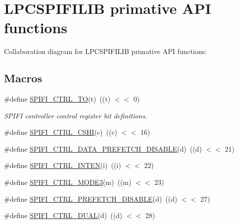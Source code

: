 \hypertarget{group___l_p_c_s_p_i_f_i_l_i_b___h_w___p_r_i_m}{}\section{L\+P\+C\+S\+P\+I\+F\+I\+L\+IB primative A\+PI functions}
\label{group___l_p_c_s_p_i_f_i_l_i_b___h_w___p_r_i_m}
Collaboration diagram for L\+P\+C\+S\+P\+I\+F\+I\+L\+IB primative A\+PI functions\+:
\subsection*{Macros}
\begin{DoxyCompactItemize}
\item 
\#define \hyperlink{group___l_p_c_s_p_i_f_i_l_i_b___h_w___p_r_i_m_ga96d43de9db048410b9d6d57de97a708d}{S\+P\+I\+F\+I\+\_\+\+C\+T\+R\+L\+\_\+\+TO}(t)~((t) $<$$<$ 0)
\begin{DoxyCompactList}\small\item\em S\+P\+I\+FI controller control register bit definitions. \end{DoxyCompactList}\item 
\#define \hyperlink{group___l_p_c_s_p_i_f_i_l_i_b___h_w___p_r_i_m_ga97562b0e2b41883d0f15e129f4b96cd7}{S\+P\+I\+F\+I\+\_\+\+C\+T\+R\+L\+\_\+\+C\+S\+HI}(c)~((c) $<$$<$ 16)
\item 
\#define \hyperlink{group___l_p_c_s_p_i_f_i_l_i_b___h_w___p_r_i_m_gaa87d14cdbb5575d56021c4fe68ec3d9f}{S\+P\+I\+F\+I\+\_\+\+C\+T\+R\+L\+\_\+\+D\+A\+T\+A\+\_\+\+P\+R\+E\+F\+E\+T\+C\+H\+\_\+\+D\+I\+S\+A\+B\+LE}(d)~((d) $<$$<$ 21)
\item 
\#define \hyperlink{group___l_p_c_s_p_i_f_i_l_i_b___h_w___p_r_i_m_ga3b934a3fc067d9b8676c6de1b4fe5f8f}{S\+P\+I\+F\+I\+\_\+\+C\+T\+R\+L\+\_\+\+I\+N\+T\+EN}(i)~((i) $<$$<$ 22)
\item 
\#define \hyperlink{group___l_p_c_s_p_i_f_i_l_i_b___h_w___p_r_i_m_ga9b92eaf07dc9eea3aed22b1e624965b2}{S\+P\+I\+F\+I\+\_\+\+C\+T\+R\+L\+\_\+\+M\+O\+D\+E3}(m)~((m) $<$$<$ 23)
\item 
\#define \hyperlink{group___l_p_c_s_p_i_f_i_l_i_b___h_w___p_r_i_m_gaba671674e51b96229b672241cefb237a}{S\+P\+I\+F\+I\+\_\+\+C\+T\+R\+L\+\_\+\+P\+R\+E\+F\+E\+T\+C\+H\+\_\+\+D\+I\+S\+A\+B\+LE}(d)~((d) $<$$<$ 27)
\item 
\#define \hyperlink{group___l_p_c_s_p_i_f_i_l_i_b___h_w___p_r_i_m_ga8d532e0a2c0eb178d12e6bddcb404258}{S\+P\+I\+F\+I\+\_\+\+C\+T\+R\+L\+\_\+\+D\+U\+AL}(d)~((d) $<$$<$ 28)
$$
\end{DoxyCompactItemize}
